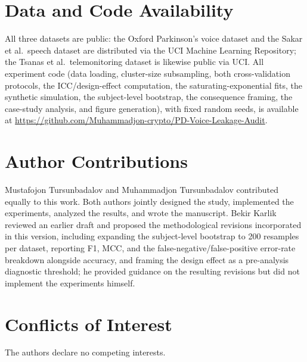 \documentclass[11pt]{article}
\begin{document}
\section*{Data and Code Availability}
All three datasets are public: the Oxford Parkinson's voice dataset \cite{little2007} and the Sakar et al.\ speech dataset \cite{sakar2019} are distributed via the UCI Machine Learning Repository; the Tsanas et al.\ telemonitoring dataset \cite{tsanas2010} is likewise public via UCI. All experiment code (data loading, cluster-size subsampling, both cross-validation protocols, the ICC/design-effect computation, the saturating-exponential fits, the synthetic simulation, the subject-level bootstrap, the consequence framing, the case-study analysis, and figure generation), with fixed random seeds, is available at \url{https://github.com/Muhammadjon-crypto/PD-Voice-Leakage-Audit}.

\section*{Author Contributions}
Mustafojon Tursunbadalov and Muhammadjon Tursunbadalov contributed equally to this work. Both authors jointly designed the study, implemented the experiments, analyzed the results, and wrote the manuscript. Bekir Karlik reviewed an earlier draft and proposed the methodological revisions incorporated in this version, including expanding the subject-level bootstrap to 200 resamples per dataset, reporting F1, MCC, and the false-negative/false-positive error-rate breakdown alongside accuracy, and framing the design effect as a pre-analysis diagnostic threshold; he provided guidance on the resulting revisions but did not implement the experiments himself.

\section*{Conflicts of Interest}
The authors declare no competing interests.
\end{document}
